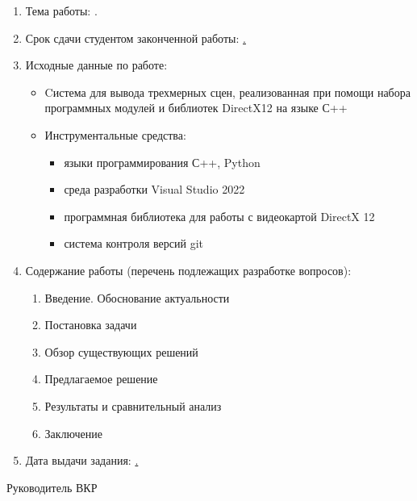 \begin{enumerate}[1.]
	\item Тема работы: {\expandafter \ulined \thesisTitle.}
	\item Срок сдачи студентом законченной работы: \uline{\thesisDeadline.} 
	\item Исходные данные по работе: %
	\begin{itemize}
		\item Cистема для вывода трехмерных сцен, реализованная при помощи набора программных модулей и библиотек DirectX12 на языке С++ \cite{me_bachelor}
		\item Инструментальные средства:
		\begin{itemize}
			\item языки программирования С++, Python
			\item среда разработки Visual Studio 2022
			\item программная библиотека для работы с видеокартой DirectX 12
			\item система контроля версий git
		\end{itemize}
	\end{itemize}
	\printbibliographyTask %
	\item Содержание работы (перечень подлежащих разработке вопросов):
	\begin{enumerate}[label=\theenumi\arabic*.]
		\item Введение. Обоснование актуальности
		\item Постановка задачи
		\item Обзор существующих решений 
		\item Предлагаемое решение
		\item Результаты и сравнительный анализ
		\item Заключение 
	\end{enumerate}
	\item Дата выдачи задания: \uline{\thesisStartDate.}
\end{enumerate}

\intervalS%

Руководитель ВКР \uline{\hspace*{0.1\textheight} \Supervisor}


